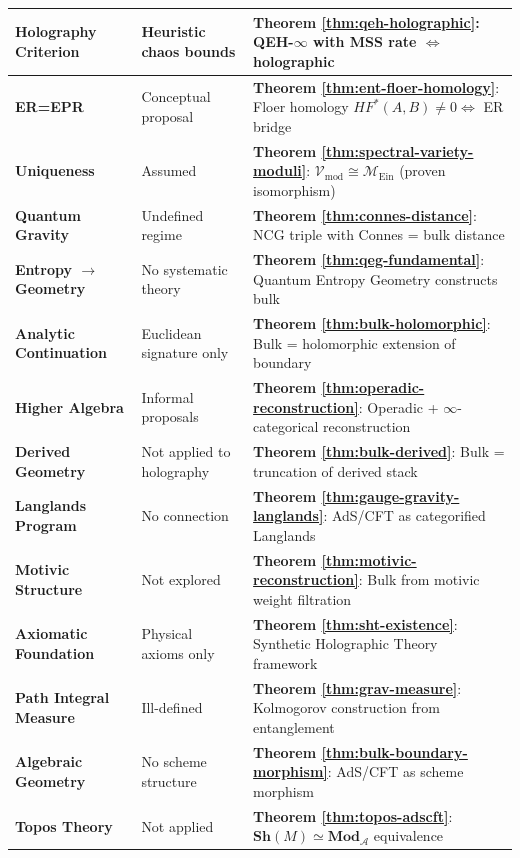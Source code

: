 \documentclass[12pt,a4paper]{article}
\begin{document}
\begin{center}
\begin{tabular}{|p{4cm}|p{5cm}|p{5cm}|}
\hline
\textbf{Holography Criterion} & Heuristic chaos bounds & \textbf{Theorem \ref{thm:qeh-holographic}}: QEH-$\infty$ with MSS rate $\Leftrightarrow$ holographic \\
\hline
\textbf{ER=EPR} & Conceptual proposal & \textbf{Theorem \ref{thm:ent-floer-homology}}: Floer homology $HF^*(A,B) \neq 0 \Leftrightarrow$ ER bridge \\
\hline
\textbf{Uniqueness} & Assumed & \textbf{Theorem \ref{thm:spectral-variety-moduli}}: $\mathcal{V}_{\text{mod}} \cong \mathcal{M}_{\text{Ein}}$ (proven isomorphism) \\
\hline
\textbf{Quantum Gravity} & Undefined regime & \textbf{Theorem \ref{thm:connes-distance}}: NCG triple with Connes = bulk distance \\
\hline
\textbf{Entropy $\to$ Geometry} & No systematic theory & \textbf{Theorem \ref{thm:qeg-fundamental}}: Quantum Entropy Geometry constructs bulk \\
\hline
\textbf{Analytic Continuation} & Euclidean signature only & \textbf{Theorem \ref{thm:bulk-holomorphic}}: Bulk = holomorphic extension of boundary \\
\hline
\textbf{Higher Algebra} & Informal proposals & \textbf{Theorem \ref{thm:operadic-reconstruction}}: Operadic + $\infty$-categorical reconstruction \\
\hline
\textbf{Derived Geometry} & Not applied to holography & \textbf{Theorem \ref{thm:bulk-derived}}: Bulk = truncation of derived stack \\
\hline
\textbf{Langlands Program} & No connection & \textbf{Theorem \ref{thm:gauge-gravity-langlands}}: AdS/CFT as categorified Langlands \\
\hline
\textbf{Motivic Structure} & Not explored & \textbf{Theorem \ref{thm:motivic-reconstruction}}: Bulk from motivic weight filtration \\
\hline
\textbf{Axiomatic Foundation} & Physical axioms only & \textbf{Theorem \ref{thm:sht-existence}}: Synthetic Holographic Theory framework \\
\hline
\textbf{Path Integral Measure} & Ill-defined & \textbf{Theorem \ref{thm:grav-measure}}: Kolmogorov construction from entanglement \\
\hline
\textbf{Algebraic Geometry} & No scheme structure & \textbf{Theorem \ref{thm:bulk-boundary-morphism}}: AdS/CFT as scheme morphism \\
\hline
\textbf{Topos Theory} & Not applied & \textbf{Theorem \ref{thm:topos-adscft}}: $\mathbf{Sh}(M) \simeq \mathbf{Mod}_{\mathcal{A}}$ equivalence \\

\end{tabular}
\end{center}
\end{document}
